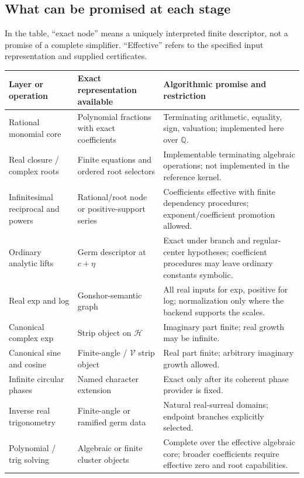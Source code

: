 \documentclass[11pt,letterpaper]{article}
\theoremstyle{definition}
\newcommand{\Q}{\mathbb Q}
\numberwithin{equation}{section}
\begin{document}
\subsection{What can be promised at each stage}
In the table, ``exact node'' means a uniquely interpreted finite descriptor, not a promise of a complete simplifier. ``Effective'' refers to the specified input representation and supplied certificates.
\begin{center}\small
\begin{longtable}{@{}L{0.23\textwidth}L{0.32\textwidth}L{0.36\textwidth}@{}}
\toprule
Layer or operation & Exact representation available & Algorithmic promise and restriction\\\midrule\endhead
Rational monomial core & Polynomial fractions with exact coefficients & Terminating arithmetic, equality, sign, valuation; implemented here over $\Q$.\\[0.35em]
Real closure / complex roots & Finite equations and ordered root selectors & Implementable terminating algebraic operations; not implemented in the reference kernel.\\[0.35em]
Infinitesimal reciprocal and powers & Rational/root node or positive-support series & Coefficients effective with finite dependency procedures; exponent/coefficient promotion allowed.\\[0.35em]
Ordinary analytic lifts & Germ descriptor at $c+\eta$ & Exact under branch and regular-center hypotheses; coefficient procedures may leave ordinary constants symbolic.\\[0.35em]
Real exp and log & Gonshor-semantic graph & All real inputs for exp, positive for log; normalization only where the backend supports the scales.\\[0.35em]
Canonical complex exp & Strip object on $\mathscr H$ & Imaginary part finite; real growth may be infinite.\\[0.35em]
Canonical sine and cosine & Finite-angle / $\mathscr V$ strip object & Real part finite; arbitrary imaginary growth allowed.\\[0.35em]
Infinite circular phases & Named character extension & Exact only after its coherent phase provider is fixed.\\[0.35em]
Inverse real trigonometry & Finite-angle or ramified germ data & Natural real-surreal domains; endpoint branches explicitly selected.\\[0.35em]
Polynomial / trig solving & Algebraic or finite cluster objects & Complete over the effective algebraic core; broader coefficients require effective zero and root capabilities.\\[0.35em]

\end{longtable}
\end{center}
\end{document}
